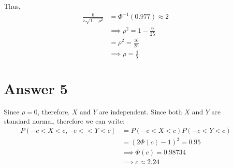 \documentclass[a4paper]{article}
\begin{document}
Thus, 
\begin{equation*}
	\begin{split}
		\frac{6}{5\sqrt{1-\rho^2} } &= \Phi^{-1}\left( 0.977 \right) \approx 2\\
		&\implies \rho^2 = 1 - \frac{9}{25}\\
		&= \rho^2 = \frac{16}{25} \\
		&\implies \rho = \frac{4}{5}
	\end{split}
\end{equation*}
\section{Answer 5}
Since $\rho = 0$, therefore,  $X$ and $Y$ are independent.
\newline\newline
Since both $X $ and  $Y$ are standard normal, therefore we can write: 
\begin{equation*}
	\begin{split}
		P\left( -c < X<c, -c< <Y<c \right) &= P\left( -c<X<c \right) P\left( -c<Y<c \right) \\
		&=  \left( 2\Phi\left( c \right) -1 \right) ^2 = 0.95\\
		&\implies \Phi\left( c \right) = 0.98734\\
		&\implies c \approx 2.24 
	\end{split}
\end{equation*}
\end{document}
